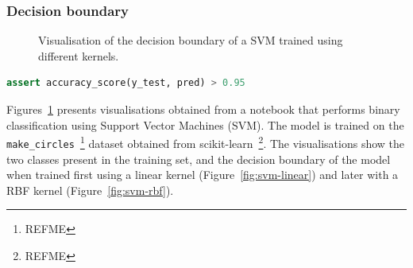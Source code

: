 \documentclass[conference]{IEEEtran}
\begin{document}
\subsubsection{Decision boundary}\label{sec:svm}

\begin{figure}
  \hfill
  \caption{Visualisation of the decision boundary of a SVM trained using different kernels.}\label{fig:svm}
\end{figure}

\begin{lstlisting}[language=Python, caption={Assertion on the accuracy of the ML model.}, label={lst:svm}]
assert accuracy_score(y_test, pred) > 0.95
\end{lstlisting}

Figures~\ref{fig:svm} presents visualisations obtained from a notebook that performs binary classification using Support Vector Machines (SVM). The model is trained on the \texttt{make\_circles}~\footnote{REFME} dataset obtained from scikit-learn~\footnote{REFME}. The visualisations show the two classes present in the training set, and the decision boundary of the model when trained first using a linear kernel (Figure~\ref{fig:svm-linear}) and later with a RBF kernel (Figure~\ref{fig:svm-rbf}).
\end{document}
